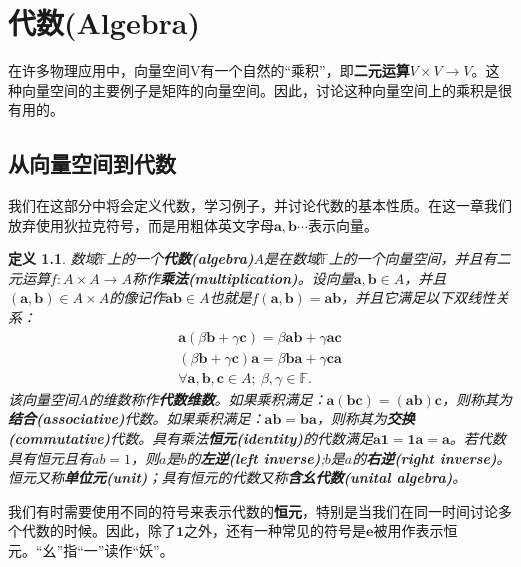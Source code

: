 \documentclass[mathserif,hyperref,UTF8,openany,b5paper]{ctexbook}
\newtheorem{defn}{定义}[section]
\begin{document}
\chapter{代数(Algebra)}
\thispagestyle{fancy}
在许多物理应用中，向量空间V有一个自然的“乘积”，即\textbf{二元运算}$V\times V\xrightarrow{}V$。这种向量空间的主要例子是矩阵的向量空间。因此，讨论这种向量空间上的乘积是很有用的。

\section{从向量空间到代数}
我们在这部分中将会定义代数，学习例子，并讨论代数的基本性质。在这一章我们放弃使用狄拉克符号，而是用粗体英文字母$\mathbf{a,b}\cdots$表示向量。
\begin{defn}
数域$\mathbb{F}$上的一个\textbf{代数(algebra)}$A$是在数域$\mathbb{F}$上的一个向量空间，并且有二元运算$f:A\times A\xrightarrow{}A$称作\textbf{乘法(multiplication)}。设向量$\mathbf{a,b}\in A$，并且$(\mathbf{a,b})\in A\times A$的像记作$\mathbf{ab}\in A$也就是$f(\mathbf{a,b})=\mathbf{ab}$，并且它满足以下双线性关系：
\begin{align}
    \mathbf{a}(\beta\mathbf{b}+\gamma\mathbf{c})=\beta\mathbf{ab}+\gamma\mathbf{ac}\\
    (\beta\mathbf{b}+\gamma\mathbf{c})\mathbf{a}=\beta\mathbf{ba}+\gamma\mathbf{ca}\\
    \forall \mathbf{a,b,c}\in A; \ \beta,\gamma\in\mathbb{F}.
\end{align}
该向量空间$A$的维数称作\textbf{代数维数}。如果乘积满足：$\mathbf{a(bc)=(ab)c}$，则称其为\textbf{结合(associative)}代数。如果乘积满足：$\mathbf{ab=ba}$，则称其为\textbf{交换(commutative)}代数。具有乘法\textbf{恒元(identity)}的代数满足$\mathbf{a1=1a=a}$。若代数具有恒元且有$ab=1$，则$a$是$b$的\textbf{左逆(left inverse)};$b$是$a$的\textbf{右逆(right inverse)}。恒元又称\textbf{单位元(unit)}；具有恒元的代数又称\textbf{含幺代数(unital algebra)}。
\end{defn}
我们有时需要使用不同的符号来表示代数的\textbf{恒元}，特别是当我们在同一时间讨论多个代数的时候。因此，除了$\mathbf{1}$之外，还有一种常见的符号是$\mathbf{e}$被用作表示恒元。“幺”指“一”读作“妖”。
\end{document}
